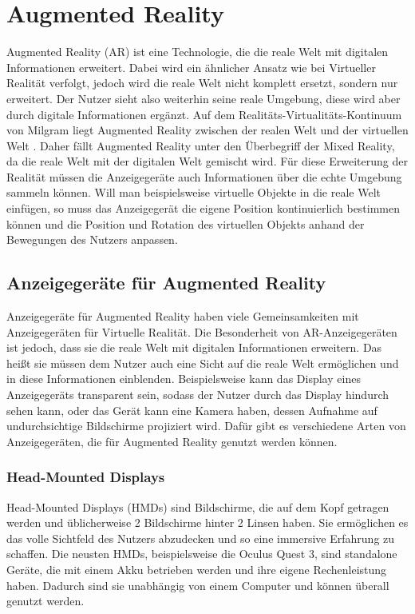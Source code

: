   \section{Augmented Reality}
  Augmented Reality (AR) ist eine Technologie, die die reale Welt mit digitalen Informationen erweitert.
  Dabei wird ein ähnlicher Ansatz wie bei Virtueller Realität verfolgt, jedoch wird die reale Welt nicht komplett ersetzt, sondern nur erweitert.
  Der Nutzer sieht also weiterhin seine reale Umgebung, diese wird aber durch digitale Informationen ergänzt.
  Auf dem Realitäts-Virtualitäts-Kontinuum von Milgram liegt Augmented Reality zwischen der realen Welt und der virtuellen Welt \autocite[vgl.][S.9]{milgram1999}.
  Daher fällt Augmented Reality unter den Überbegriff der Mixed Reality, da die reale Welt mit der digitalen Welt gemischt wird.
  Für diese Erweiterung der Realität müssen die Anzeigegeräte auch Informationen über die echte Umgebung sammeln können.
  Will man beispielsweise virtuelle Objekte in die reale Welt einfügen, so muss das Anzeigegerät die eigene Position kontinuierlich bestimmen können und die Position und Rotation des virtuellen Objekts anhand der Bewegungen des Nutzers anpassen.

    \subsection{Anzeigegeräte für Augmented Reality}

    Anzeigegeräte für Augmented Reality haben viele Gemeinsamkeiten mit Anzeigegeräten für Virtuelle Realität.
    Die Besonderheit von AR-Anzeigegeräten ist jedoch, dass sie die reale Welt mit digitalen Informationen erweitern.
    Das heißt sie müssen dem Nutzer auch eine Sicht auf die reale Welt ermöglichen und in diese Informationen einblenden.
    Beispielsweise kann das Display eines Anzeigegeräts transparent sein, sodass der Nutzer durch das Display hindurch sehen kann, oder das Gerät kann eine Kamera haben, dessen Aufnahme auf undurchsichtige Bildschirme projiziert wird.
    Dafür gibt es verschiedene Arten von Anzeigegeräten, die für Augmented Reality genutzt werden können.

    \subsubsection{Head-Mounted Displays}

    Head-Mounted Displays (HMDs) sind Bildschirme, die auf dem Kopf getragen werden und üblicherweise 2 Bildschirme hinter 2 Linsen haben.
    Sie ermöglichen es das volle Sichtfeld des Nutzers abzudecken und so eine immersive Erfahrung zu schaffen.
    Die neusten HMDs, beispielsweise die Oculus Quest 3, sind standalone Geräte, die mit einem Akku betrieben werden und ihre eigene Rechenleistung haben.
    Dadurch sind sie unabhängig von einem Computer und können überall genutzt werden.

